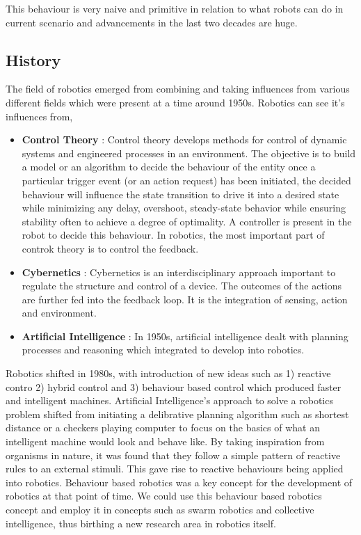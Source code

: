 This behaviour is very naive and primitive in relation to what robots can do in current scenario and advancements in the last two decades are huge.

\subsection{History}
The field of robotics emerged from combining and taking influences from various different fields which were present at a time around 1950s.
Robotics can see it's influences from,
\begin{itemize}
    \item \textbf{Control Theory} : Control theory \cite{enwiki:1039308545} develops methods for control of dynamic systems and engineered processes in an environment. The objective is to build a model or an algorithm to decide the behaviour of the entity once a particular trigger event (or an action request) has been initiated, the decided behaviour will influence the state transition to drive it into a desired state while minimizing any delay, overshoot, steady-state behavior while ensuring stability often to achieve a degree of optimality. A controller is present in the robot to decide this behaviour. In robotics, the most important part of controk theory is to control the feedback.
    \item \textbf{Cybernetics} : Cybernetics \cite{enwiki:1037814219} is an interdisciplinary approach important to regulate the structure and control of a device. The outcomes of the actions are further fed into the feedback loop. It is the integration of sensing, action and environment. 
    \item \textbf{Artificial Intelligence} : In 1950s, artificial intelligence dealt with planning processes and reasoning which integrated to develop into robotics.
\end{itemize}
Robotics shifted in 1980s, with introduction of new ideas such as 1) reactive contro 2) hybrid control and 3) behaviour based control which produced faster and intelligent machines. Artificial Intelligence's approach to solve a robotics problem shifted from initiating
a delibrative planning algorithm such as shortest distance or a checkers playing computer to focus on the basics of what an intelligent machine would look and behave like. By taking inspiration from organisms in nature, it was found that they follow a simple pattern of reactive rules to an external stimuli. This gave rise to reactive behaviours being applied into robotics.
Behaviour based robotics was a key concept for the development of robotics at that point of time.  We could use this behaviour based robotics concept and employ it in concepts such as swarm robotics and collective intelligence, thus birthing a new research area in robotics itself.
